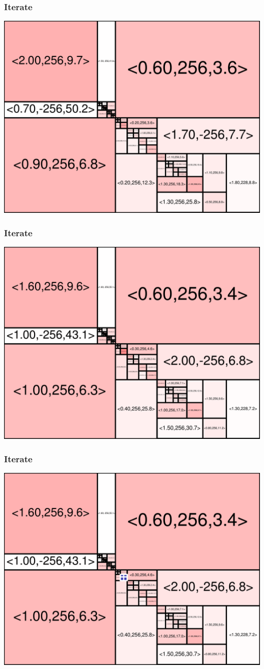 \begin{frame}
\frametitle{Iterate}\begin{centering}\includegraphics[width=8.5 cm]{remy-graph/graph/test75.pdf}

\end{centering}\end{frame}


\begin{frame}
\frametitle{Iterate}\begin{centering}\includegraphics[width=8.5 cm]{remy-graph/graph/test76.pdf}

\end{centering}\end{frame}


\begin{frame}
\frametitle{Iterate}\begin{centering}\includegraphics[width=8.5 cm]{remy-graph/graph/test77.pdf}

\end{centering}\end{frame}


